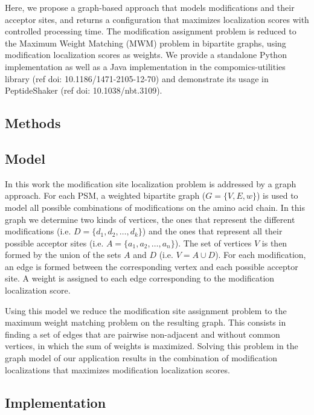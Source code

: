\documentclass{bioinfo}
\begin{document}
Here, we propose a graph-based approach that models modifications and their acceptor sites, and returns a configuration that maximizes localization scores with controlled processing time. The modification assignment problem is reduced to the Maximum Weight Matching (MWM) problem in bipartite graphs, using modification localization scores as weights. We provide a standalone Python implementation as well as a Java implementation in the compomics-utilities library (ref doi: 10.1186/1471-2105-12-70) and demonstrate its usage in PeptideShaker (ref doi: 10.1038/nbt.3109).


\begin{methods}
\section{Methods}

\subsection{Model}

In this work the modification site localization problem is addressed by a graph approach. For each PSM, a weighted bipartite graph ($G = \{V,E,w\}$) is used to model all possible combinations of modifications on the amino acid chain. In this graph we determine two kinds of vertices, the ones that represent the different modifications (i.e. $D = \{d_1, d_2, \dots, d_k\}$) and the ones that represent all their possible acceptor sites (i.e. $A = \{a_1, a_2, \dots, a_n\}$). The set of vertices $V$ is then formed by the union of the sets $A$ and $D$ (i.e. $V = A \cup D$). For each modification, an edge is formed between the corresponding vertex and each possible acceptor site. A weight is assigned to each edge corresponding to the modification localization score.

Using this model we reduce the modification site assignment problem to the maximum weight matching problem on the resulting graph. This consists in finding a set of edges that are pairwise non-adjacent and without common vertices, in which the sum of weights is maximized. Solving this problem in the graph model of our application results in the combination of modification localizations that maximizes modification localization scores. 



\subsection{Implementation}


\end{methods}
\end{document}
